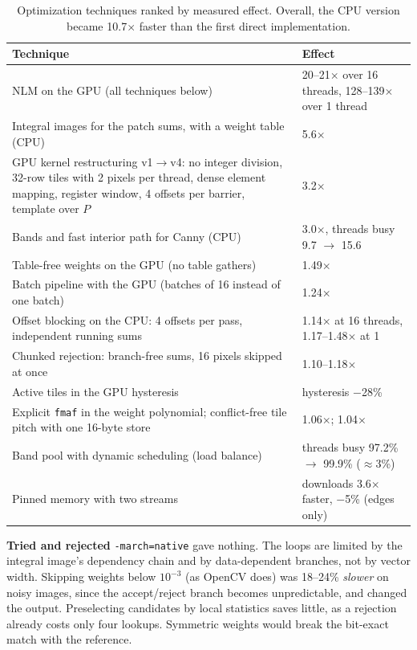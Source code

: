 \documentclass[10pt,a4paper]{article}
\begin{document}
\begin{table}[H]
	\centering\footnotesize
	\begin{tabular}{p{10.8cm}p{5.3cm}}
		\toprule
		\textbf{Technique} & \textbf{Effect}\\
		\midrule
		NLM on the GPU (all techniques below) & 20--21$\times$ over 16 threads, 128--139$\times$ over 1 thread\\
		Integral images for the patch sums, with a weight table (CPU) & 5.6$\times$\\
		GPU kernel restructuring v1$\to$v4: no integer division, 32-row tiles with 2 pixels per thread, dense element mapping, register window, 4 offsets per barrier, template over $P$ & 3.2$\times$\\
		Bands and fast interior path for Canny (CPU) & 3.0$\times$, threads busy 9.7 $\to$ 15.6\\
		Table-free weights on the GPU (no table gathers) & 1.49$\times$\\
		Batch pipeline with the GPU (batches of 16 instead of one batch) & 1.24$\times$\\
		Offset blocking on the CPU: 4 offsets per pass, independent running sums & 1.14$\times$ at 16 threads, 1.17--1.48$\times$ at 1\\
		Chunked rejection: branch-free sums, 16 pixels skipped at once & 1.10--1.18$\times$\\
		Active tiles in the GPU hysteresis & hysteresis $-$28\%\\
		Explicit \texttt{fmaf} in the weight polynomial; conflict-free tile pitch with one 16-byte store & 1.06$\times$; 1.04$\times$\\
		Band pool with dynamic scheduling (load balance) & threads busy 97.2\% $\to$ 99.9\% ($\approx$3\%)\\
		Pinned memory with two streams & downloads 3.6$\times$ faster, $-$5\% (edges only)\\
		\bottomrule
	\end{tabular}
	\caption{Optimization techniques ranked by measured effect. Overall, the CPU version became 10.7$\times$ faster than the first direct implementation.}
	\label{tab:opt}
\end{table}

\textbf{Tried and rejected} \texttt{-march=native} gave nothing. The loops are limited by the integral image's dependency
chain and by data-dependent branches, not by vector width. Skipping weights below $10^{-3}$ (as OpenCV does) was 18--24\%
\emph{slower} on noisy images, since the accept/reject branch becomes unpredictable, and changed the output. Preselecting
candidates by local statistics \cite{mahmoudi05,coupe08} saves little, as a rejection already costs only four lookups.
Symmetric weights would break the bit-exact match with the reference.
\end{document}

